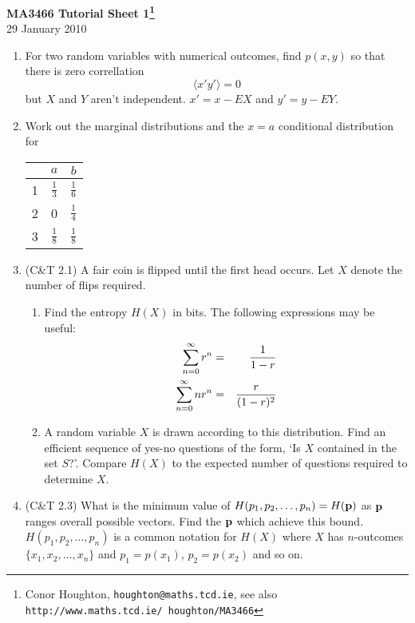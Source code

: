 \documentclass[12pt]{article}
\begin{document}
\begin{center}
{\bf MA3466 Tutorial Sheet 1\footnote{Conor Houghton, {\tt houghton@maths.tcd.ie}, see also {\tt http://www.maths.tcd.ie/ houghton/MA3466}}}\\[1cm]{} 29 January 2010
\end{center}
\begin{enumerate}

\item For two random variables with numerical outcomes, find $p(x,y)$ so that there is zero correllation
\begin{equation}
\langle x'y'\rangle=0 
\end{equation}
but $X$ and $Y$ aren't independent. $x'=x-EX$ and $y'=y-EY$. 

\item Work out the marginal distributions and the $x=a$ conditional distribution for
\begin{center}
\begin{tabular}{c|cc}
&$a$&$b$\\
\hline
1&$\frac{1}{3}$&$\frac{1}{6}$\\
2&0&$\frac{1}{4}$\\
3&$\frac{1}{8}$&$\frac{1}{8}$
\end{tabular}
\end{center}



\item (C\&T 2.1) A fair coin is flipped until the first head occurs. Let $X$ denote the number of flips required.
\begin{enumerate}
\item Find the entropy $H(X)$ in bits. The following expressions may be useful:\begin{eqnarray}
\sum_{n=0}^{\infty} r^n&=&\frac{1}{1-r}\cr
\sum_{n=0}^{\infty}nr^n&=&\frac{r}{(1-r)^2}
\end{eqnarray}
\item A random variable $X$ is drawn according to this distribution. Find an efficient sequence of yes-no questions of the form, \lq Is $X$ contained in the set $S$?\rq{}. Compare $H(X)$ to the expected number of questions required to determine $X$.
\end{enumerate}

\item (C\&T 2.3) What is the minimum value of $H(p_1,p_2,\ldots,p_n)=H({\bf p})$ as ${\bf p}$ ranges overall possible vectors. Find the ${\bf p}$ which achieve this bound. $H(p_1,p_2,\ldots,p_n)$ is a common notation for $H(X)$ where $X$ has $n$-outcomes $\{x_1,x_2,\ldots,x_n\}$ and $p_1=p(x_1)$, $p_2=p(x_2)$ and so on.


\end{enumerate}
\end{document}
